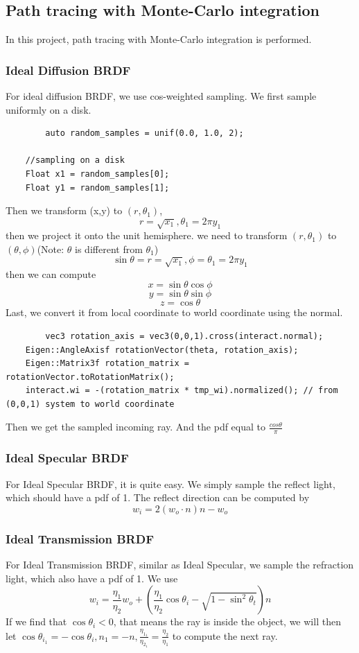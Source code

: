 \documentclass[acmtog]{acmart}
\begin{document}
\subsection{Path tracing with Monte-Carlo integration}
In this project, path tracing with Monte-Carlo integration is performed.
\subsubsection{Ideal Diffusion BRDF}
	\quad For ideal diffusion BRDF, we use cos-weighted sampling. We first sample uniformly on a disk.
	\begin{lstlisting}
		auto random_samples = unif(0.0, 1.0, 2);

	//sampling on a disk
	Float x1 = random_samples[0];
	Float y1 = random_samples[1];
	\end{lstlisting}
	Then we transform (x,y) to $(r,\theta_1)$, $$r = \sqrt{x_1}, \theta_1 = 2\pi y_1 $$
	then we project it onto the unit hemisphere. we need to transform $(r, \theta_1)$ to $(\theta, \phi)$(Note: $\theta$ is different from $\theta_1$)
	$$\sin\theta = r = \sqrt{x_1}, \phi = \theta_1 = 2\pi y_1 $$
	then we can compute $$ x = \sin\theta\cos\phi $$$$ y = \sin\theta\sin\phi $$$$ z = \cos\theta$$
	Last, we convert it from local coordinate to world coordinate using the normal.
	\begin{lstlisting}
		vec3 rotation_axis = vec3(0,0,1).cross(interact.normal);
	Eigen::AngleAxisf rotationVector(theta, rotation_axis);
	Eigen::Matrix3f rotation_matrix = rotationVector.toRotationMatrix();
	interact.wi = -(rotation_matrix * tmp_wi).normalized(); // from (0,0,1) system to world coordinate
	\end{lstlisting}
	Then we get the sampled incoming ray. And the pdf equal to $\frac{cos\theta}{\pi}$
\subsubsection{Ideal Specular BRDF}
	\quad For Ideal Specular BRDF, it is quite easy. We simply sample the reflect light, which should have a pdf of 1.
	The reflect direction can be computed by $$w_i = 2(w_o \cdot n)n - w_o$$
\subsubsection{Ideal Transmission BRDF}
	\quad For Ideal Transmission BRDF, similar as Ideal Specular, we sample the refraction light, which also have a pdf of 1.
	We use $$w_i = \frac{\eta_1}{\eta_2}w_o + (\frac{\eta_1}{\eta_2}\cos \theta_i - \sqrt{1 - \sin^2 \theta_t})n$$
	If we find that $\cos \theta_i < 0$, that means the ray is inside the object, we will then let $\cos \theta_{i_1} = -\cos \theta_{i}, n_1 = -n, \frac{\eta_{1_1}}{\eta_{2_1}} = \frac{\eta_2}{\eta_1}$ to compute the next ray.
\end{document}
